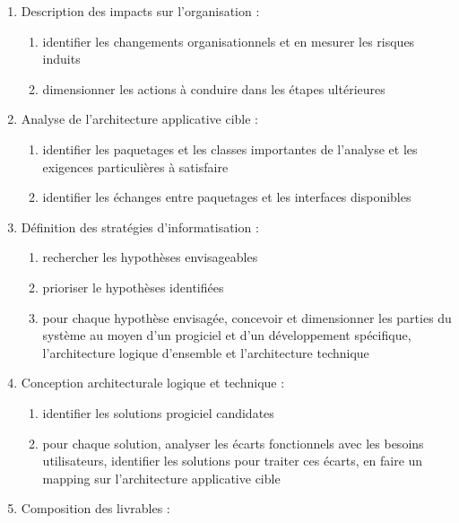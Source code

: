 \begin{enumerate}
          \begin{enumerate}
            \item Description des impacts sur l'organisation : 
                \begin{enumerate}
                  \item identifier les changements organisationnels et en mesurer les risques induits
                  \item dimensionner les actions à conduire dans les étapes ultérieures
                \end{enumerate}
            \item Analyse de l'architecture applicative cible : 
                \begin{enumerate}
                  \item identifier les paquetages et les classes importantes de l'analyse et les exigences particulières à satisfaire 
                  \item identifier les échanges entre paquetages et les interfaces disponibles 
                \end{enumerate}
            \item Définition des stratégies d'informatisation : 
                \begin{enumerate}
                  \item rechercher les hypothèses envisageables 
                  \item prioriser le hypothèses identifiées
                  \item pour chaque hypothèse envisagée, concevoir et dimensionner les parties du système au moyen d'un progiciel et d'un développement spécifique, l'architecture logique d'ensemble et l'architecture technique
                \end{enumerate}
            \item Conception architecturale logique et technique : 
                \begin{enumerate}
                  \item identifier les solutions progiciel candidates 
                  \item pour chaque solution, analyser les écarts fonctionnels avec les besoins utilisateurs, identifier les solutions pour traiter ces écarts, en faire un mapping sur l'architecture applicative cible
                \end{enumerate}
            \item Composition des livrables : 
                \begin{enumerate}

\end{enumerate}
\end{enumerate}
\end{enumerate}
